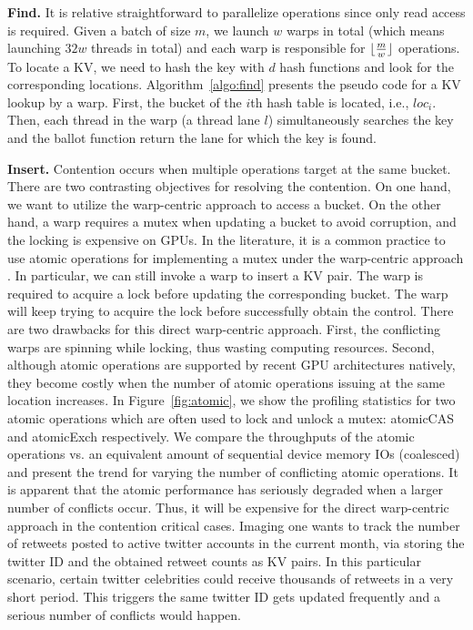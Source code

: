 \vspace{1mm}\noindent\textbf{Find.} It is relative straightforward to parallelize  operations since only read access is required. 
Given a batch of size $m$, we launch $w$ warps in total (which means launching $32w$ threads in total) and each warp is responsible for $\lfloor\frac{m}{w}\rfloor$  operations. To locate a KV, we need to hash the key with $d$ hash functions and look for the corresponding locations. 
Algorithm~\ref{algo:find} presents the pseudo code for a KV lookup by a warp. 
First, the bucket of the $i$th hash table is located, i.e., $loc_i$.
Then, each thread in the warp (a thread lane $l$) simultaneously searches the key and the ballot function return the lane for which the key is found.




\vspace{1mm}\noindent\textbf{Insert.} Contention occurs when multiple  operations target at the same bucket. 
There are two contrasting objectives for resolving the contention. On one hand, we want to utilize the warp-centric approach to access a bucket.
On the other hand, a warp requires a mutex when updating a bucket to avoid corruption, and the locking is expensive on GPUs.  
In the literature, it is a common practice to use atomic operations for implementing a mutex under the warp-centric approach \cite{zhang2015mega}. 
In particular, we can still invoke a warp to insert a KV pair. The warp is required to acquire a lock before updating the corresponding bucket. 
The warp will keep trying to acquire the lock before successfully obtain the control. 
There are two drawbacks for this direct warp-centric approach. 
First, the conflicting warps are spinning while locking, thus wasting computing resources.
Second, although atomic operations are supported by recent GPU architectures natively, 
they become costly when the number of atomic operations issuing at the same location increases. 
In Figure~\ref{fig:atomic}, we show the profiling statistics for two atomic operations which are often used to lock and unlock a mutex: atomicCAS and atomicExch respectively. 
We compare the throughputs of the atomic operations vs. an equivalent amount of sequential device memory IOs (coalesced) and present the trend for varying the number of conflicting atomic operations. It is apparent that the atomic performance has seriously degraded when a larger number of conflicts occur. 
Thus, it will be expensive for the direct warp-centric approach in the contention critical cases. 
Imaging one wants to track the number of retweets posted to active twitter accounts in the current month, via storing the twitter ID and the obtained retweet counts as KV pairs. In this particular scenario, certain twitter celebrities could receive thousands of retweets in a very short period. 
This triggers the same twitter ID gets updated frequently and a serious number of conflicts would happen. 


